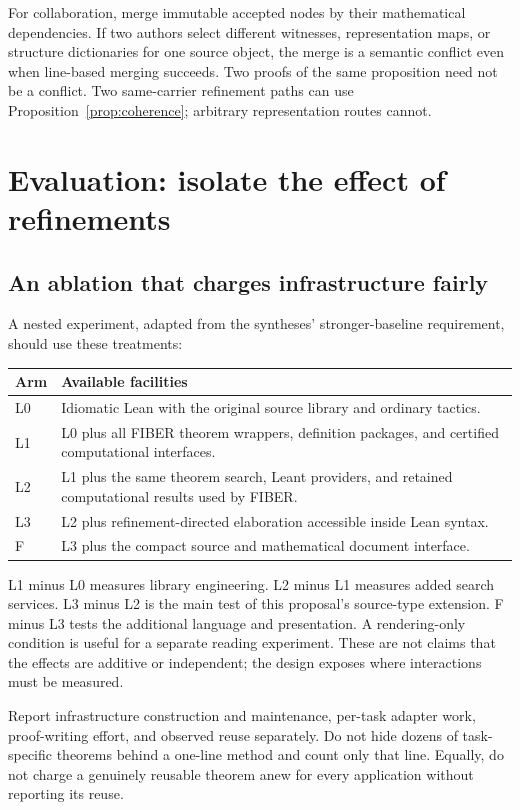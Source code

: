\documentclass[11pt,letterpaper]{article}
\theoremstyle{definition}\newtheorem{definition}[theorem]{Definition}
\begin{document}
For collaboration, merge immutable accepted nodes by their mathematical dependencies. If two authors select different witnesses, representation maps, or structure dictionaries for one source object, the merge is a semantic conflict even when line-based merging succeeds. Two proofs of the same proposition need not be a conflict. Two same-carrier refinement paths can use Proposition~\ref{prop:coherence}; arbitrary representation routes cannot.

\section{Evaluation: isolate the effect of refinements}\label{sec:evaluation}
\subsection{An ablation that charges infrastructure fairly}
A nested experiment, adapted from the syntheses' stronger-baseline requirement, should use these treatments:
\begin{center}\small
\begin{tabularx}{\textwidth}{@{}L{0.45in}Y@{}}
\toprule
Arm & Available facilities\\\midrule
L0 & Idiomatic Lean with the original source library and ordinary tactics.\\
L1 & L0 plus all FIBER theorem wrappers, definition packages, and certified computational interfaces.\\
L2 & L1 plus the same theorem search, Leant providers, and retained computational results used by FIBER.\\
L3 & L2 plus refinement-directed elaboration accessible inside Lean syntax.\\
F & L3 plus the compact source and mathematical document interface.\\
\bottomrule
\end{tabularx}
\end{center}
L1 minus L0 measures library engineering. L2 minus L1 measures added search services. L3 minus L2 is the main test of this proposal's source-type extension. F minus L3 tests the additional language and presentation. A rendering-only condition is useful for a separate reading experiment. These are not claims that the effects are additive or independent; the design exposes where interactions must be measured.

Report infrastructure construction and maintenance, per-task adapter work, proof-writing effort, and observed reuse separately. Do not hide dozens of task-specific theorems behind a one-line method and count only that line. Equally, do not charge a genuinely reusable theorem anew for every application without reporting its reuse.
\end{document}
